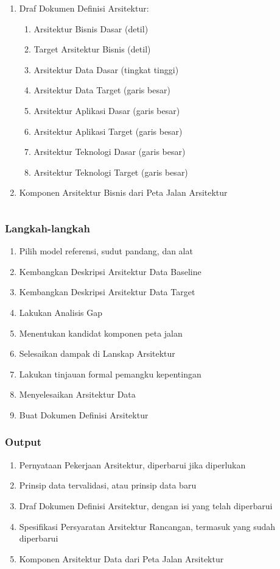 \documentclass[aspectratio=169]{beamer}
\begin{document}
\begin{frame}
\begin{columns}
\begin{column}{0.5\textwidth}
\begin{center}
\begin{enumerate}
						\item Draf Dokumen Definisi Arsitektur:
						\begin{enumerate}
							\item Arsitektur Bisnis Dasar (detil)
							\item Target Arsitektur Bisnis (detil)
							\item Arsitektur Data Dasar (tingkat tinggi)
							\item Arsitektur Data Target (garis besar)
							\item Arsitektur Aplikasi Dasar (garis besar)
							\item Arsitektur Aplikasi Target (garis besar)
							\item Arsitektur Teknologi Dasar (garis besar)
							\item Arsitektur Teknologi Target (garis besar)
						\end{enumerate}
						\item Komponen Arsitektur Bisnis dari Peta Jalan Arsitektur
					\end{enumerate}
				\end{center}
			\end{column}
		\end{columns}
	\end{frame}
	
	\begin{frame}
		\frametitle{Langkah-langkah}
		\begin{enumerate}
			\item Pilih model referensi, sudut pandang, dan alat
			\item Kembangkan Deskripsi Arsitektur Data Baseline
			\item Kembangkan Deskripsi Arsitektur Data Target
			\item Lakukan Analisis Gap
			\item Menentukan kandidat komponen peta jalan
			\item Selesaikan dampak di Lanskap Arsitektur
			\item Lakukan tinjauan formal pemangku kepentingan
			\item Menyelesaikan Arsitektur Data
			\item Buat Dokumen Definisi Arsitektur
		\end{enumerate}
	\end{frame}
	
	\begin{frame}
		\frametitle{Output}
		\begin{enumerate}
			\item Pernyataan Pekerjaan Arsitektur, diperbarui jika diperlukan
			\item Prinsip data tervalidasi, atau prinsip data baru
			\item Draf Dokumen Definisi Arsitektur, dengan isi yang telah diperbarui
			\item Spesifikasi Persyaratan Arsitektur Rancangan, termasuk yang sudah diperbarui
			\item Komponen Arsitektur Data dari Peta Jalan Arsitektur
		\end{enumerate}
	\end{frame}
	
\end{document}
